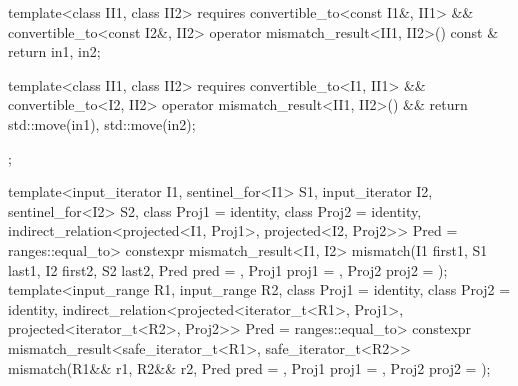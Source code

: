 \begin{codeblock}
{{{      template<class II1, class II2>
        requires convertible_to<const I1&, II1> && convertible_to<const I2&, II2>
        operator mismatch_result<II1, II2>() const & {
          return {in1, in2};
        }

      template<class II1, class II2>
        requires convertible_to<I1, II1> && convertible_to<I2, II2>
        operator mismatch_result<II1, II2>() && {
          return {std::move(in1), std::move(in2)};
        }
    };

    template<input_iterator I1, sentinel_for<I1> S1, input_iterator I2, sentinel_for<I2> S2,
             class Proj1 = identity, class Proj2 = identity,
             indirect_relation<projected<I1, Proj1>,
                               projected<I2, Proj2>> Pred = ranges::equal_to>
      constexpr mismatch_result<I1, I2>
        mismatch(I1 first1, S1 last1, I2 first2, S2 last2, Pred pred = {},
                 Proj1 proj1 = {}, Proj2 proj2 = {});
    template<input_range R1, input_range R2,
             class Proj1 = identity, class Proj2 = identity,
             indirect_relation<projected<iterator_t<R1>, Proj1>,
                               projected<iterator_t<R2>, Proj2>> Pred = ranges::equal_to>
      constexpr mismatch_result<safe_iterator_t<R1>, safe_iterator_t<R2>>
        mismatch(R1&& r1, R2&& r2, Pred pred = {},
                 Proj1 proj1 = {}, Proj2 proj2 = {});
  }

}
\end{codeblock}
